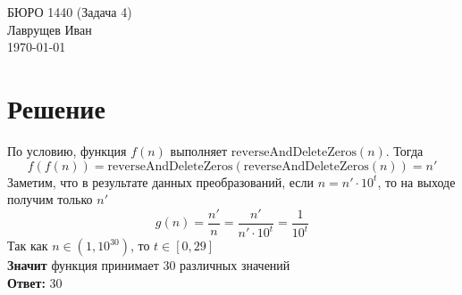\documentclass{article}
\begin{document}
\begingroup
    \centering
    \LARGE БЮРО 1440 (Задача 4)\\
    \LARGE Лаврущев Иван\\
    \large \today \\[0.5em]
\endgroup

\large
\section*{Решение}

По условию, функция $f(n) \text{ выполняет } \text{reverseAndDeleteZeros}(n)$. Тогда
$$f(f(n)) = \text{reverseAndDeleteZeros}(\text{reverseAndDeleteZeros}(n)) = n'$$
Заметим, что в результате данных преобразований, если $n = n' \cdot 10^t$, то на выходе получим только $n'$
$$g(n) = \frac{n'}{n} = \frac{n'}{n' \cdot 10^t} = \frac{1}{10^t}$$
Так как $n \in (1, 10^{30})$, то $t \in [0, 29]$\\
\textbf{Значит} функция принимает 30 различных значений\\
\textbf{Ответ:} 30
\end{document}
